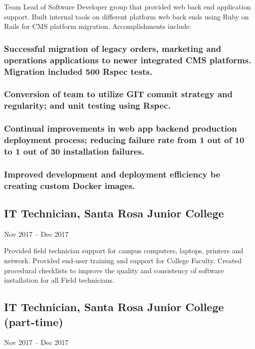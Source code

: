 \documentclass{article}
\begin{document}
        \vspace{0mm}
        Team Lead of Software Developer group that provided web back end application support. Built internal tools on different platform web back ends using Ruby on Rails for CMS platform migration. Accomplishments include:

        \vspace{-2mm}
        \subsubsection{Successful migration of legacy orders, marketing and operations applications to newer integrated CMS platforms. Migration included 500 Rspec tests.}
        \subsubsection{Conversion of team to utilize GIT commit strategy and regularity; and unit testing using Rspec.}
        \subsubsection{Continual improvements in web app backend production deployment process; reducing failure rate from 1 out of 10 to 1 out of 30 installation failures.}
        \subsubsection{Improved development and deployment efficiency be creating custom Docker images.}
    \subsection{IT Technician, Santa Rosa Junior College} Nov 2017 – Dec 2017
    
            \vspace{0mm}

    Provided field technician support for campus computers, laptops, printers and network. Provided end-user training and support for College Faculty. Created procedural checklists to improve the quality and consistency of software installation for all Field technicians.


        
    \subsection{IT Technician, Santa Rosa Junior College (part-time)}Nov 2017 – Dec 2017
        
\end{document}
